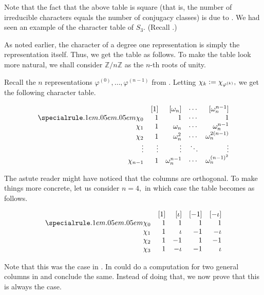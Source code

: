 Note that the fact that the above table is square (that is, the number of irreducible characters equals the number of conjugacy classes) is due to . We had seen an example of the character table of $S_3.$ (Recall .)

\begin{ex}
	As noted earlier, the character of a degree one representation is simply the representation itself. Thus, we get the table as follows. To make the table look more natural, we shall consider $\mathbb{Z}/n\mathbb{Z}$ as the $n$-th roots of unity.

	Recall the $n$ representations $\varphi^{(0)}, \ldots, \varphi^{(n-1)}$ from . Letting $\chi_k \vcentcolon= \chi_{\varphi^{(k)}},$ we get the following character table.

	\captionsetup{type=figure}
	\[\begin{array}{rrrrr}
		 & [1] & [\omega_n] & \cdots & [\omega_n^{n-1}]\\
		\thiccline
		\chi_0 & 1 & 1 & \cdots & 1\\
		\chi_1 & 1 & \omega_n & \cdots & \omega_n^{n-1} \\
		\chi_2 & 1 & \omega_n^2 & \cdots & \omega_n^{2(n - 1)}\\
		\vdots & \vdots & \vdots & \ddots & \vdots\\
		\chi_{n-1} & 1 & \omega_n^{n-1} & \cdots & \omega_n^{(n-1)^2}
	\end{array}\]
	 \label{tab:charZnZ}

	The astute reader might have noticed that the columns are orthogonal. To make things more concrete, let us consider $n = 4,$ in which case the table becomes as follows.

	\[\begin{array}{rrrrr}
		 & [1] & [\iota] & [-1] & [-\iota]\\
		\thiccline
		\chi_0 & 1 & 1 & 1 & 1\\
		\chi_1 & 1 & \iota & -1 & -\iota\\
		\chi_2 & 1 & -1 & 1 & -1\\
		\chi_3 & 1 & -\iota & -1 & \iota
	\end{array}\]

	Note that this was the case in . In could do a computation for two general columns in  and conclude the same. Instead of doing that, we now prove that this is always the case.	
\end{ex}


